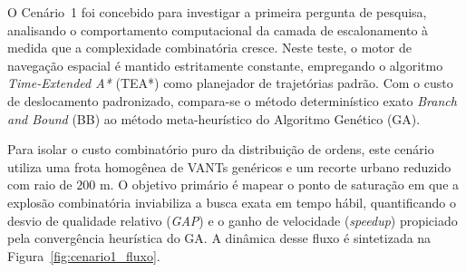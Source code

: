O Cenário~1 foi concebido para investigar a primeira pergunta de pesquisa, analisando o comportamento computacional da camada de escalonamento à medida que a complexidade combinatória cresce. Neste teste, o motor de navegação espacial é mantido estritamente constante, empregando o algoritmo \textit{Time-Extended A*} (TEA*) como planejador de trajetórias padrão. Com o custo de deslocamento padronizado, compara-se o método determinístico exato \textit{Branch and Bound} (BB) ao método meta-heurístico do Algoritmo Genético (GA).

Para isolar o custo combinatório puro da distribuição de ordens, este cenário utiliza uma frota homogênea de VANTs genéricos e um recorte urbano reduzido com raio de $200\text{ m}$. O objetivo primário é mapear o ponto de saturação em que a explosão combinatória inviabiliza a busca exata em tempo hábil, quantificando o desvio de qualidade relativo (\textit{GAP}) e o ganho de velocidade (\textit{speedup}) propiciado pela convergência heurística do GA. A dinâmica desse fluxo é sintetizada na Figura~\ref{fig:cenario1_fluxo}.

